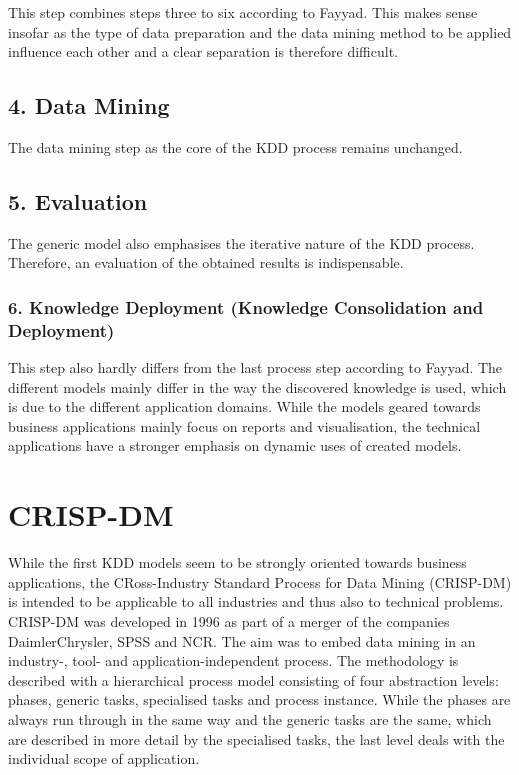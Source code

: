 This step combines steps three to six according to Fayyad. This makes sense insofar as the type of data preparation and the data mining method to be applied influence each other and a clear separation is therefore difficult.


\subsection{4. Data Mining}

The data mining step as the core of the KDD process remains unchanged.

\subsection{5. Evaluation}

The generic model also emphasises the iterative nature of the KDD process. Therefore, an evaluation of the obtained results is indispensable.

\subsubsection{6. Knowledge Deployment (Knowledge Consolidation and Deployment)}

This step also hardly differs from the last process step according to Fayyad. The different models mainly differ in the way the discovered knowledge is used, which is due to the different application domains. While the models geared towards business applications mainly focus on reports and visualisation, the technical applications have a stronger emphasis on dynamic uses of created models.


\section{CRISP-DM} \label{CRISP}

While the first KDD models seem to be strongly oriented towards business applications, the CRoss-Industry Standard Process for Data Mining (CRISP-DM) is intended to be applicable to all industries and thus also to technical problems. CRISP-DM was developed in 1996 as part of a merger of the companies DaimlerChrysler, SPSS and NCR. The aim was to embed data mining in an industry-, tool- and application-independent process. The methodology is described with a hierarchical process model consisting of four abstraction levels: phases, generic tasks, specialised tasks and process instance. While the phases are always run through in the same way and the generic tasks are the same, which are described in more detail by the specialised tasks, the last level deals with the individual scope of application. \cite{Chapman:2000}

